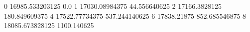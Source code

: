 0 16985.533203125 0.0
1 17030.08984375 44.556640625
2 17166.3828125 180.849609375
4 17522.77734375 537.244140625
6 17838.21875 852.685546875
8 18085.673828125 1100.140625
